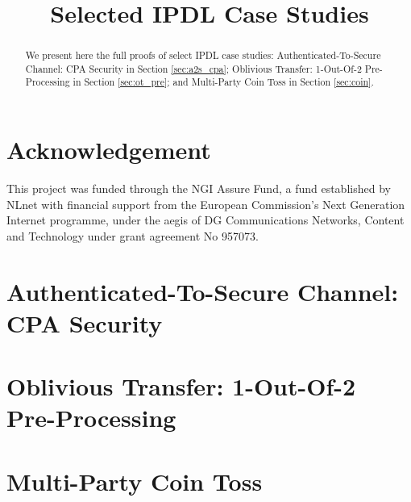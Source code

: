 \documentclass[11pt,hidelinks]{article}
\newcommand{\ipdl}{\textsf{IPDL} }
\begin{document}
\title{Selected \ipdl Case Studies}

\maketitle

\begin{abstract}
We present here the full proofs of select \ipdl case studies: Authenticated-To-Secure Channel: CPA Security in Section \ref{sec:a2s_cpa}; Oblivious Transfer: 1-Out-Of-2 Pre-Processing in Section \ref{sec:ot_pre}; and Multi-Party Coin Toss in Section \ref{sec:coin}.
\end{abstract}

\section*{\small Acknowledgement}
This project was funded through the NGI Assure Fund, a fund established by NLnet with financial support from the European Commission's Next Generation Internet programme, under the aegis of DG Communications Networks, Content and Technology under grant agreement No 957073.

\section{Authenticated-To-Secure Channel: CPA Security}\label{sec:a2s_cpa}


%

\section{Oblivious Transfer: 1-Out-Of-2 Pre-Processing}\label{sec:ot_pre}


\section{Multi-Party Coin Toss}\label{sec:coin}

\end{document}
